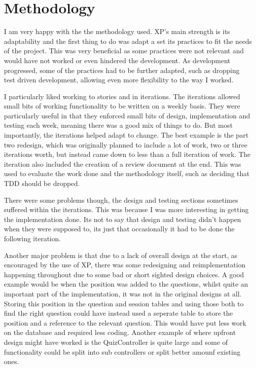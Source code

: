 \section{Methodology}
I am very happy with the the methodology used. XP's main strength is its adaptability and the first thing to do was adapt a set its practices to fit the needs of the project. This was very beneficial as some practices were not relevant and would have not worked or even hindered the development. As development progressed, some of the practices had to be further adapted, such as dropping test driven development, allowing even more flexibility to the way I worked.

I particularly liked working to stories and in iterations. The iterations allowed small bits of working functionality to be written on a weekly basis. They were particularly useful in that they enforced small bits of design, implementation and testing each week, meaning there was a good mix of things to do. But most importantly, the iterations helped adapt to change. The best example is the part two redesign, which was originally planned to include a lot of work, two or three iterations worth, but instead came down to less than a full iteration of work. The iteration also included the creation of a review document at the end. This was used to evaluate the work done and the methodology itself, such as deciding that TDD should be dropped.

There were some problems though, the design and testing sections sometimes suffered within the iterations. This was because I was more interesting in getting the implementation done. Its not to say that design and testing didn't happen when they were supposed to, its just that occasionally it had to be done the following iteration.

Another major problem is that due to a lack of overall design at the start, as encouraged by the use of XP, there was some redesigning and reimplementation happening throughout due to some bad or short sighted design choices. A good example would be when the position was added to the questions, whilst quite an important part of the implementation, it was not in the original designs at all. Storing this position in the question and session tables and using those both to find the right question could have instead used a seperate table to store the position and a reference to the relevant question. This would have put less work on the database and required less coding. Another example of where upfront design might have worked is the QuizController is quite large and some of functionality could be split into sub controllers or split better amounf existing ones.

